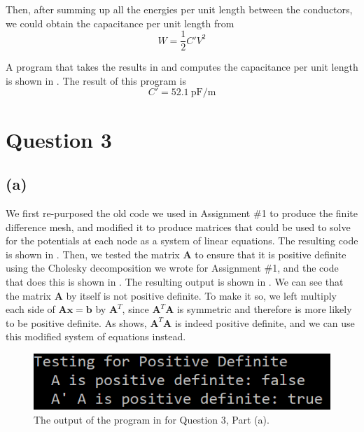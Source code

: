\documentclass[journal,hidelinks]{IEEEtran}
\begin{document}
Then, after summing up all the energies per unit length between the conductors, we could obtain the capacitance per unit length from
\begin{equation}
W = \frac{1}{2} C' V^2
\end{equation}

A program that takes the results in  and computes the capacitance per unit length is shown in . The result of this program is
\begin{equation}
C' = \SI{52.1}{\pico\farad\per\meter}
\end{equation}

\section*{Question 3}

\subsection*{(a)}

We first re-purposed the old code we used in Assignment \#1 to produce the finite difference mesh, and modified it to produce matrices that could be used to solve for the potentials at each node as a system of linear equations. The resulting code is shown in . Then, we tested the matrix $\boldsymbol{A}$ to ensure that it is positive definite using the Cholesky decomposition we wrote for Assignment \#1, and the code that does this is shown in . The resulting output is shown in . We can see that the matrix $\boldsymbol{A}$ by itself is not positive definite. To make it so, we left multiply each side of $\boldsymbol{A} \boldsymbol{x} = \boldsymbol{b}$ by $\boldsymbol{A}^T$, since $\boldsymbol{A}^T \boldsymbol{A}$ is symmetric and therefore is more likely to be positive definite. As  shows, $\boldsymbol{A}^T \boldsymbol{A}$ is indeed positive definite, and we can use this modified system of equations instead.

\begin{figure}[!htb]
  \centering
  \includegraphics[width=\columnwidth]{question-3/positive_definite.png}
  \caption{The output of the program in  for Question 3, Part (a).}
  \label{fig:positive_definite}
\end{figure}
\end{document}
